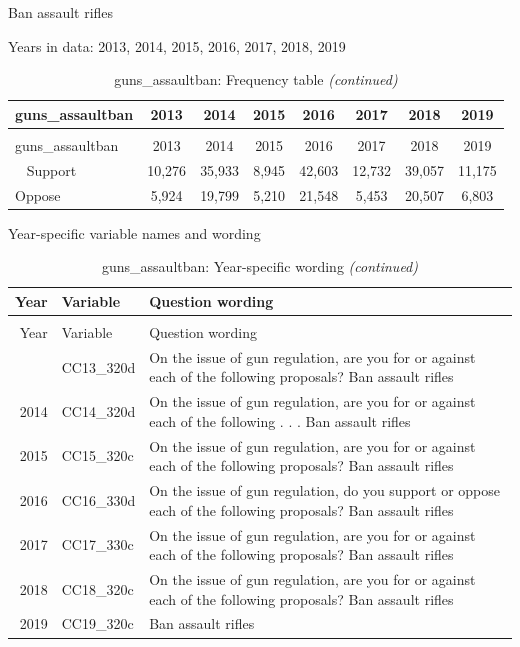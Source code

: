 \documentclass[12pt]{article}
\begin{document}
Ban assault rifles

Years in data: 2013, 2014, 2015, 2016, 2017, 2018, 2019

\begin{longtable}[t]{lccccccc}
\caption{\label{tab:unnamed-chunk-4}guns\_assaultban: Frequency table}\\
\toprule
guns\_assaultban & 2013 & 2014 & 2015 & 2016 & 2017 & 2018 & 2019\\
\midrule
\endfirsthead
\caption[]{guns\_assaultban: Frequency table \textit{(continued)}}\\
\toprule
guns\_assaultban & 2013 & 2014 & 2015 & 2016 & 2017 & 2018 & 2019\\
\midrule
\endhead
\
\endfoot
\bottomrule
\endlastfoot
Support & 10,276 & 35,933 & 8,945 & 42,603 & 12,732 & 39,057 & 11,175\\
Oppose & 5,924 & 19,799 & 5,210 & 21,548 & 5,453 & 20,507 & 6,803\\*
\end{longtable}

Year-specific variable names and wording

\begin{longtable}[t]{rl>{\raggedright\arraybackslash}p{10cm}}
\caption{\label{tab:unnamed-chunk-4}guns\_assaultban: Year-specific wording}\\
\toprule
Year & Variable & Question wording\\
\midrule
\endfirsthead
\caption[]{guns\_assaultban: Year-specific wording \textit{(continued)}}\\
\toprule
Year & Variable & Question wording\\
\midrule
\endhead
\
\endfoot
\bottomrule
\endlastfoot
2013 & CC13\_320d & On the issue of gun regulation, are you for or against each of the following proposals? Ban assault rifles\\
2014 & CC14\_320d & On the issue of gun regulation, are you for or against each of the following . . . Ban assault rifles\\
2015 & CC15\_320c & On the issue of gun regulation, are you for or against each of the following proposals? Ban assault rifles\\
2016 & CC16\_330d & On the issue of gun regulation, do you support or oppose each of the following proposals? Ban assault rifles\\
2017 & CC17\_330c & On the issue of gun regulation, are you for or against each of the following proposals? Ban assault rifles\\
2018 & CC18\_320c & On the issue of gun regulation, are you for or against each of the following proposals? Ban assault rifles\\
2019 & CC19\_320c & Ban assault rifles\\*
\end{longtable}
\end{document}
